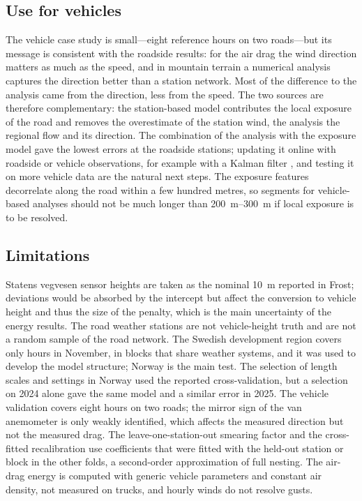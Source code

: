 \subsection{Use for vehicles}
The vehicle case study is small---eight reference hours on two roads---but its message is consistent with the roadside results: for the air drag the wind direction matters as much as the speed, and in mountain terrain a numerical analysis captures the direction better than a station network. Most of the difference to the analysis came from the direction, less from the speed. The two sources are therefore complementary: the station-based model contributes the local exposure of the road and removes the overestimate of the station wind, the analysis the regional flow and its direction. The combination of the analysis with the exposure model gave the lowest errors at the roadside stations; updating it online with roadside or vehicle observations, for example with a Kalman filter \citep{Louka2008}, and testing it on more vehicle data are the natural next steps. The exposure features decorrelate along the road within a few hundred metres, so segments for vehicle-based analyses should not be much longer than \SIrange{200}{300}{m} if local exposure is to be resolved.

\subsection{Limitations}
Statens vegvesen sensor heights are taken as the nominal \SI{10}{m} reported in Frost; deviations would be absorbed by the intercept but affect the conversion to vehicle height and thus the size of the penalty, which is the main uncertainty of the energy results. The road weather stations are not vehicle-height truth and are not a random sample of the road network. The Swedish development region covers only \seHours{} hours in November, in blocks that share weather systems, and it was used to develop the model structure; Norway is the main test. The selection of length scales and settings in Norway used the reported cross-validation, but a selection on 2024 alone gave the same model and a similar error in 2025. The vehicle validation covers eight hours on two roads; the mirror sign of the van anemometer is only weakly identified, which affects the measured direction but not the measured drag. The leave-one-station-out smearing factor and the cross-fitted recalibration use coefficients that were fitted with the held-out station or block in the other folds, a second-order approximation of full nesting. The air-drag energy is computed with generic vehicle parameters and constant air density, not measured on trucks, and hourly winds do not resolve gusts.
